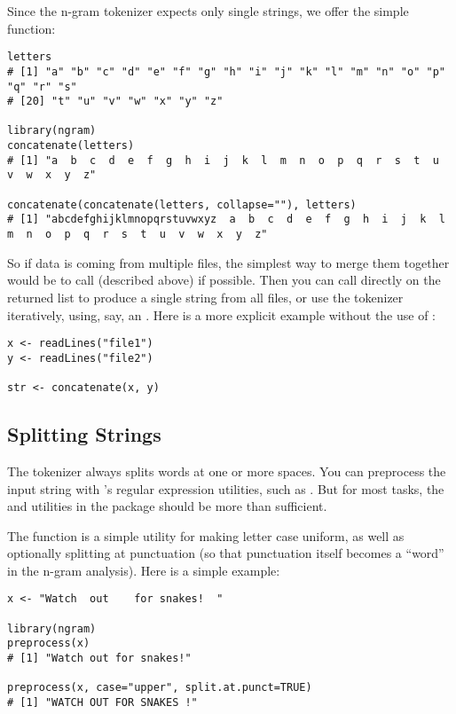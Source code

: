 Since the n-gram tokenizer expects only single strings, we offer the simple  function:
\begin{lstlisting}[language=rr]
letters
# [1] "a" "b" "c" "d" "e" "f" "g" "h" "i" "j" "k" "l" "m" "n" "o" "p" "q" "r" "s"
# [20] "t" "u" "v" "w" "x" "y" "z"

library(ngram)
concatenate(letters)
# [1] "a  b  c  d  e  f  g  h  i  j  k  l  m  n  o  p  q  r  s  t  u  v  w  x  y  z"

concatenate(concatenate(letters, collapse=""), letters)
# [1] "abcdefghijklmnopqrstuvwxyz  a  b  c  d  e  f  g  h  i  j  k  l  m  n  o  p  q  r  s  t  u  v  w  x  y  z"
\end{lstlisting}
So if data is coming from multiple files, the simplest way to merge them 
together would be to call  (described above) if possible.  Then you can call  directly on the returned list to produce a single string from all files, or use the tokenizer iteratively, using, say, an .  Here is a more explicit example without the use of :
\begin{lstlisting}[language=rr]
x <- readLines("file1")
y <- readLines("file2")

str <- concatenate(x, y)
\end{lstlisting}



\subsection{Splitting Strings}

The  tokenizer always splits words at one or more spaces. You can preprocess the input string with \R's regular expression utilities, such as .  But for most tasks, the  and  utilities in the \thispackage package should be more than sufficient.


The  function is a simple utility for making letter case uniform, as well as optionally splitting at punctuation (so that punctuation itself becomes a ``word'' in the n-gram analysis).  Here is a simple example:
\begin{lstlisting}[language=rr]
x <- "Watch  out    for snakes!  "

library(ngram)
preprocess(x)
# [1] "Watch out for snakes!"

preprocess(x, case="upper", split.at.punct=TRUE)
# [1] "WATCH OUT FOR SNAKES !"
\end{lstlisting}

